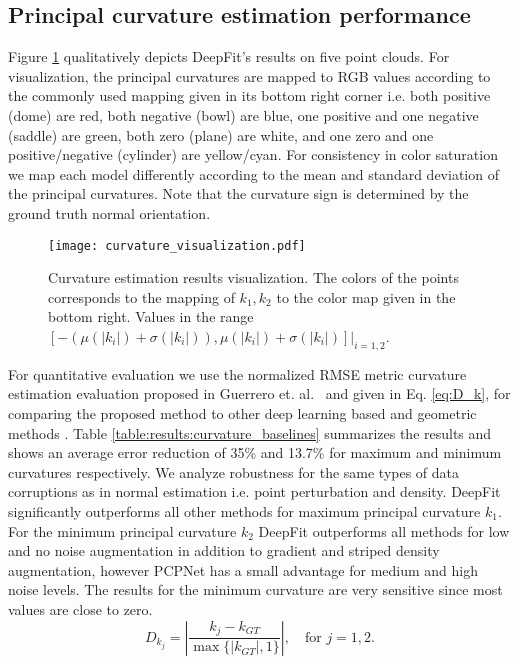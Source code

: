 \subsection{Principal curvature estimation performance}
\label{SubSec:results:baseline_c_est}
Figure \ref{fig:curvature_result_visualization} qualitatively depicts DeepFit's results on five point clouds. For visualization, the principal curvatures are mapped to RGB values according to the commonly used mapping given in its bottom right corner i.e. both positive (dome) are red, both negative (bowl) are blue, one positive and one negative (saddle) are green, both zero (plane) are white, and one zero and one positive/negative (cylinder) are yellow/cyan. For consistency in color saturation we map each model differently according to the mean and standard deviation of the principal curvatures.  Note that the curvature sign is determined by the ground truth normal orientation. 

\begin{figure}
\centering
    	\texttt{[image: curvature\_visualization.pdf]}
	\caption{Curvature estimation results visualization.  The colors of the points corresponds to the mapping of $k_1, k_2$  to the color map given in the bottom right. Values in the range $[-(\mu(|k_i|)+\sigma(|k_i|)),\mu(|k_i|)+\sigma(|k_i|)] |_{i=1,2}$.}
	\label{fig:curvature_result_visualization}
\end{figure}

For quantitative evaluation we use the normalized RMSE metric curvature estimation evaluation proposed in Guerrero et. al.~\cite{guerrero2018pcpnet} and given in Eq. \ref{eq:D_k}, for comparing the proposed method to other deep learning based  \cite{guerrero2018pcpnet} and geometric methods \cite{cazals2005estimating}. Table \ref{table:results:curvature_baselines} summarizes the results and shows an average error reduction of 35\% and 13.7\% for maximum and minimum curvatures respectively. We analyze robustness for the same types of data corruptions as in normal estimation i.e. point perturbation and density. DeepFit significantly outperforms all other methods for maximum principal curvature $k_1$. For the minimum principal curvature $k_2$ DeepFit outperforms all methods for low and no noise augmentation in addition to gradient and striped density augmentation,  however PCPNet has a small advantage for medium and high noise levels. The results for the minimum curvature are very sensitive since most values are close to zero. 
\begin{equation}
\label{eq:D_k}
    D_{k_j} = \left\lvert \frac{k_j-k_{GT}}{ \max\{|k_{GT}|, 1\}} \right\rvert, \quad \text{for } j=1,2.
\end{equation}

